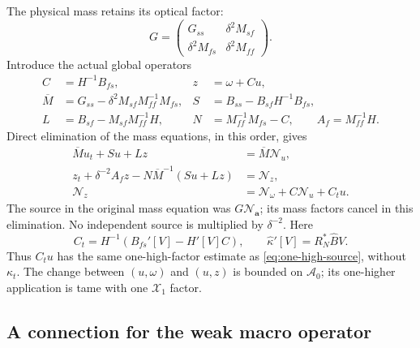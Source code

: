 \documentclass[11pt,a4paper]{article}
\numberwithin{equation}{section}
\theoremstyle{remark}
\newcommand{\Xone}{\mathcal X_1}
\newcommand{\Azero}{\mathcal A_0}
\begin{document}
The physical mass retains its optical factor:
\[
 G=\begin{pmatrix}G_{ss}&\delta^2M_{sf}\\
             \delta^2M_{fs}&\delta^2M_{ff}\end{pmatrix}.
\]
Introduce the actual global operators
\begin{equation}\label{eq:schur-defs}
 \begin{aligned}
 C&=H^{-1}B_{fs},& z&=\omega+Cu,\\
 \overline M&=G_{ss}-\delta^2M_{sf}M_{ff}^{-1}M_{fs},&
 S&=B_{ss}-B_{sf}H^{-1}B_{fs},\\
 L&=B_{sf}-M_{sf}M_{ff}^{-1}H,&
 N&=M_{ff}^{-1}M_{fs}-C,\qquad A_f=M_{ff}^{-1}H .
 \end{aligned}
\end{equation}
Direct elimination of the mass equations, in this order, gives
\begin{equation}\label{eq:schur-system}
 \begin{aligned}
 \overline M u_t+Su+Lz&=\overline M\mathcal N_u,\\
 z_t+\delta^{-2}A_fz-N\overline M^{-1}(Su+Lz)
       &=\mathcal N_z,\\
 \mathcal N_z&=\mathcal N_\omega+C\mathcal N_u+C_tu .
 \end{aligned}
\end{equation}
The source in the original mass equation was \(G\mathcal N_{\mathbf a}\);
its mass factors cancel in this elimination. No independent source
is multiplied by \(\delta^{-2}\).
Here
\[
 C_t=H^{-1}(B_{fs}'[V]-H'[V]C),\qquad
 \widehat\kappa'[V]=R_N^*\widehat B V .
\]
Thus \(C_tu\) has the same one-high-factor estimate as
\eqref{eq:one-high-source}, without \(\kappa_t\).
The change between \((u,\omega)\) and \((u,z)\) is bounded on
\(\Azero\); its one-higher application is tame with one \(\Xone\)
factor.

\subsection{A connection for the weak macro operator}
\end{document}
